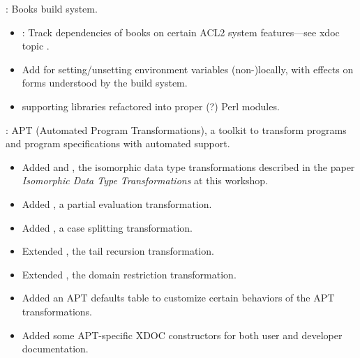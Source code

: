 
\begin{frame}

\implibtitle

:
Books build system.
\begin{itemize}
\item {}: Track dependencies of books on certain ACL2 system features---see xdoc topic .
\item Add  for setting/unsetting environment
  variables (non-)locally, with effects on  forms
  understood by the build system.
\item {} supporting libraries refactored into proper (?) Perl modules.
\end{itemize}

\end{frame}


\begin{frame}

\implibtitle

:
APT (Automated Program Transformations),
a toolkit to transform programs and program specifications
with automated support.
\begin{itemize}
\item
Added  and ,
the isomorphic data type transformations
described in the paper
\textit{Isomorphic Data Type Transformations} at this workshop.
\item
Added , a partial evaluation transformation.
\item
Added , a case splitting transformation.
\item
Extended , the tail recursion transformation.
\item
Extended , the domain restriction transformation.
\item
Added an APT defaults table
to customize certain behaviors of the APT transformations.
\item
Added some APT-specific XDOC constructors
for both user and developer documentation.
\end{itemize}

\end{frame}

